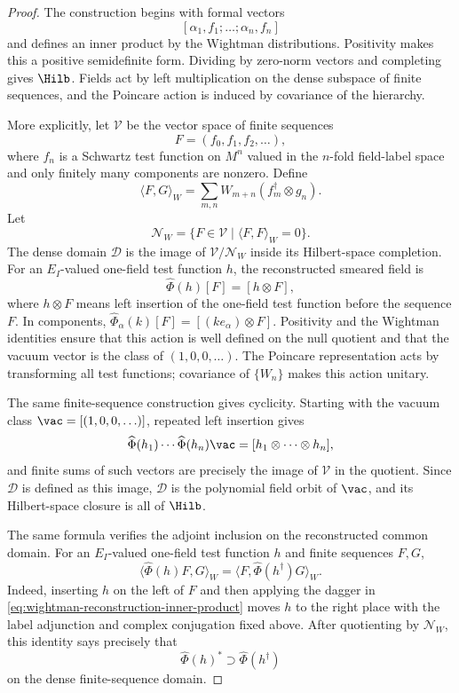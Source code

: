 \begin{proof}
The construction begins with formal vectors
\[
  [\alpha_1,f_1;\ldots ;\alpha_n,f_n]
\]
and defines an inner product by the Wightman distributions.  Positivity makes
this a positive semidefinite form.  Dividing by zero-norm vectors and
completing gives \(\Hilb\).  Fields act by left multiplication on the dense
subspace of finite sequences, and the Poincare action is induced by covariance
of the hierarchy.

More explicitly, let \(\mathcal V\) be the vector space of finite sequences
\[
  F=(f_0,f_1,f_2,\ldots),
\]
where \(f_n\) is a Schwartz test function on \(M^n\) valued in the \(n\)-fold
field-label space and only finitely many components are nonzero.  Define
\begin{equation}
  \langle F,G\rangle_W
  =
  \sum_{m,n}
  W_{m+n}(f_m^\dagger\otimes g_n).
  \label{eq:wightman-reconstruction-inner-product}
\end{equation}
Let
\[
  \mathcal N_W=\{F\in\mathcal V\mid \langle F,F\rangle_W=0\}.
\]
The dense domain \(\mathcal D\) is the image of \(\mathcal V/\mathcal N_W\)
inside its Hilbert-space completion.  For an \(E_I\)-valued one-field test
function \(h\), the reconstructed smeared field is
\[
  \widehat\Phi(h)[F]=[h\otimes F],
\]
where \(h\otimes F\) means left insertion of the one-field test function before
the sequence \(F\).  In components,
\(\widehat\Phi_\alpha(k)[F]=[(k e_\alpha)\otimes F]\).  Positivity and the
Wightman identities
ensure that this action is well defined on the null quotient and that the
vacuum vector is the class of \((1,0,0,\ldots)\).  The Poincare
representation acts by transforming all test functions; covariance of
\(\{W_n\}\) makes this action unitary.

The same finite-sequence construction gives cyclicity.  Starting with the
vacuum class \(\vac=[(1,0,0,\ldots)]\), repeated left insertion gives
\[
  \widehat\Phi(h_1)\cdots\widehat\Phi(h_n)\vac
  =
  [h_1\otimes\cdots\otimes h_n],
\]
and finite sums of such vectors are precisely the image of \(\mathcal V\) in
the quotient.  Since \(\mathcal D\) is defined as this image, \(\mathcal D\) is
the polynomial field orbit of \(\vac\), and its Hilbert-space closure is all of
\(\Hilb\).

The same formula verifies the adjoint inclusion on the reconstructed common
domain.  For an \(E_I\)-valued one-field test function \(h\) and finite
sequences \(F,G\),
\[
  \langle \widehat\Phi(h)F,G\rangle_W
  =
  \langle F,\widehat\Phi(h^\dagger)G\rangle_W .
\]
Indeed, inserting \(h\) on the left of \(F\) and then applying the dagger in
\eqref{eq:wightman-reconstruction-inner-product} moves \(h\) to the right
place with the label adjunction and complex conjugation fixed above.  After
quotienting by \(\mathcal N_W\), this identity says precisely that
\[
  \widehat\Phi(h)^*\supset \widehat\Phi(h^\dagger)
\]
on the dense finite-sequence domain.


\end{proof}
